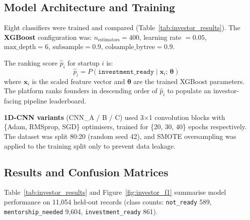 \documentclass{article}
\begin{document}
\FloatBarrier
\subsection{Model Architecture and Training}

Eight classifiers were trained and compared (Table~\ref{tab:investor_results}).
The \textbf{XGBoost} configuration was:
$n_\text{estimators} = 400$,
learning rate $= 0.05$,
$\text{max\_depth} = 6$,
$\text{subsample} = 0.9$,
$\text{colsample\_bytree} = 0.9$.

The ranking score $\hat{p}_i$ for startup $i$ is:
\begin{equation}
\hat{p}_i = P(\texttt{investment\_ready} \mid \mathbf{x}_i;\, \boldsymbol{\theta})
\label{eq:rank_score}
\end{equation}
where $\mathbf{x}_i$ is the scaled feature vector and $\boldsymbol{\theta}$ are
the trained XGBoost parameters. The platform ranks founders in descending order
of $\hat{p}_i$ to populate an investor-facing pipeline leaderboard.

\textbf{1D-CNN variants} (CNN\_A / B / C) used 3$\times$1 convolution blocks
with \{Adam, RMSprop, SGD\} optimisers, trained for \{20, 30, 40\} epochs
respectively. The dataset was split 80:20 (random seed 42), and SMOTE
oversampling was applied to the training split only to prevent data leakage.

\FloatBarrier
\subsection{Results and Confusion Matrices}

Table~\ref{tab:investor_results} and Figure~\ref{fig:investor_f1} summarise
model performance on 11{,}054 held-out records (class counts:
\texttt{not\_ready} 589, \texttt{mentorship\_needed} 9{,}604,
\texttt{investment\_ready} 861).
\end{document}
